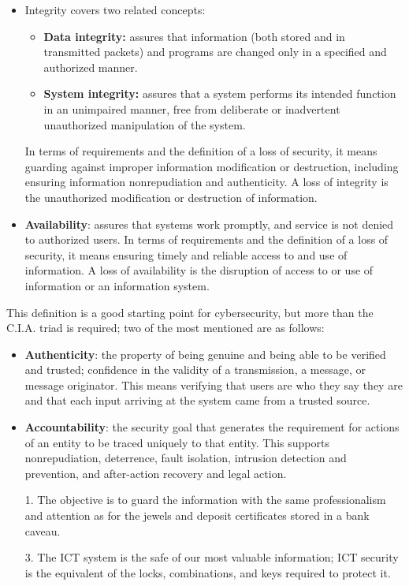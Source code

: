 {\begin{itemize}
    \item Integrity covers two related concepts:
    \begin{itemize}
        \item \textbf{Data integrity:} assures that information (both stored and in transmitted packets) and programs are changed only in a specified and authorized manner.
        \item \textbf{System integrity:} assures that a system performs its intended function in an unimpaired manner, free from deliberate or inadvertent unauthorized manipulation of the system.
    \end{itemize}
    In terms of requirements and the definition of a loss of security, it means guarding against improper information modification or destruction, including ensuring information nonrepudiation and authenticity. A loss of integrity is the unauthorized modification or destruction of information.

    \item \textbf{Availability}: assures that systems work promptly, and service is not denied to authorized users. In terms of requirements and the definition of a loss of security, it means ensuring timely and reliable access to and use of information. A loss of availability is the disruption of access to or use of information or an information system.
\end{itemize}

This definition is a good starting point for cybersecurity, but more than the C.I.A. triad is required; two of the most mentioned are as follows:

\begin{itemize}
    \item \textbf{Authenticity}: the property of being genuine and being able to be verified and trusted; confidence in the validity of a transmission, a message, or message originator. This means verifying that users are who they say they are and that each input arriving at the system came from a trusted source.

    \item \textbf{Accountability}: the security goal that generates the requirement for actions of an entity to be traced uniquely to that entity. This supports nonrepudiation, deterrence, fault isolation, intrusion detection and prevention, and after-action recovery and legal action.
\end{itemize}
\begin{enumerate}
  \item[1.] The objective is to guard the information with the same professionalism and attention as for the jewels and deposit certificates stored in a bank caveau.
  \item[3.] The ICT system is the safe of our most valuable information; ICT security is the equivalent of the locks, combinations, and keys required to protect it.
\end{enumerate}

}{
}



